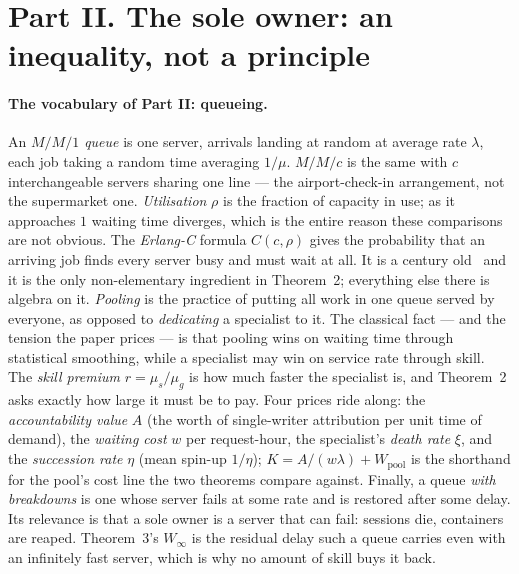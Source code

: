 \documentclass[11pt,a4paper]{article}
\begin{document}
\section{Part II. The sole owner: an inequality, not a principle}\label{sec:queue}\label{sec:thm-boundary}

\paragraph{The vocabulary of Part II: queueing.} An \emph{$M/M/1$ queue} is one server, arrivals landing at random at average
rate $\lambda$, each job taking a random time averaging $1/\mu$. \emph{$M/M/c$} is the same with $c$ interchangeable servers
sharing one line --- the airport-check-in arrangement, not the supermarket one. \emph{Utilisation} $\rho$ is the fraction of
capacity in use; as it approaches $1$ waiting time diverges, which is the entire reason these comparisons are not obvious.
The \emph{Erlang-C} formula $C(c,\rho)$ gives the probability that an arriving job finds every server busy and must wait at
all. It is a century old~\cite{erlang17} and it is the only non-elementary ingredient in Theorem~2; everything else there is
algebra on it. \emph{Pooling} is the practice of putting all work in one queue served by everyone, as opposed to
\emph{dedicating} a specialist to it. The classical fact --- and the tension the paper prices --- is that pooling wins on
waiting time through statistical smoothing, while a specialist may win on service rate through skill. The \emph{skill premium}
$r = \mu_s/\mu_g$ is how much faster the specialist is, and Theorem~2 asks exactly how large it must be to pay. Four prices ride
along: the \emph{accountability value} $A$ (the worth of single-writer attribution per unit time of demand), the \emph{waiting
cost} $w$ per request-hour, the specialist's \emph{death rate} $\xi$, and the \emph{succession rate} $\eta$ (mean spin-up
$1/\eta$); $K = A/(w\lambda) + W_{\mathrm{pool}}$ is the shorthand for the pool's cost line the two theorems compare against.
Finally, a queue \emph{with breakdowns} is one whose server fails at some rate and is restored after some delay. Its
relevance is that a sole owner is a server that can fail: sessions die, containers are reaped. Theorem~3's $W_\infty$ is the
residual delay such a queue carries even with an infinitely fast server, which is why no amount of skill buys it back.
\end{document}
